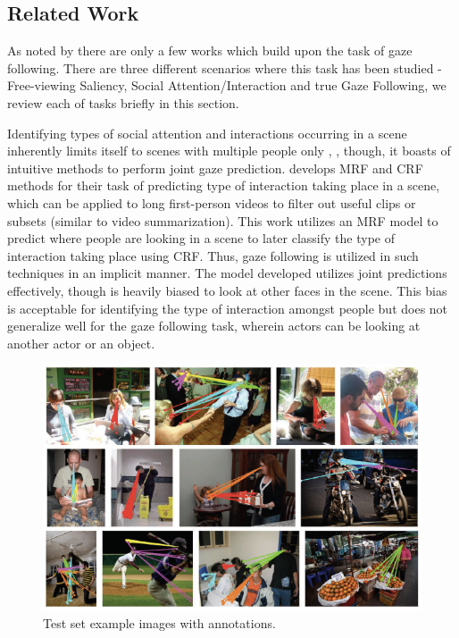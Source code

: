 \documentclass[10pt,twocolumn,letterpaper]{article}
\begin{document}
\subsection{Related Work}

As noted by \cite{nips15_recasens} there are only a few works which build upon the task of gaze following. There are three different scenarios where this task has been studied - Free-viewing Saliency, Social Attention/Interaction and true Gaze Following, we review each of tasks briefly in this section.

Identifying types of social attention and interactions occurring in a scene inherently limits itself to scenes with multiple people only \cite{fathi2012social} \cite{marin2014detecting} \cite{soo2015social}, \cite{soo2013predicting}, though, it boasts of intuitive methods to perform joint gaze prediction. \cite{fathi2012social} develops MRF and CRF methods for their task of predicting type of interaction taking place in a scene, which can be applied to long first-person videos to filter out useful clips or subsets (similar to video summarization). This work utilizes an MRF model to predict where people are looking in a scene to later classify the type of interaction taking place using CRF. Thus, gaze following is utilized in such techniques in an implicit manner. The model developed utilizes joint predictions effectively, though is heavily biased to look at other faces in the scene. This bias is acceptable for identifying the type of interaction amongst people but does not generalize well for the gaze following task, wherein actors can be looking at another actor or an object.

\begin{figure}[t]
  \begin{center}
    \includegraphics[width=0.70\linewidth]{images/dataset_images.PNG}
  \end{center}
  \vspace{-0.3cm}
   \caption{Test set example images with annotations.}
  \vspace{-0.5cm}
\end{figure}
\end{document}
